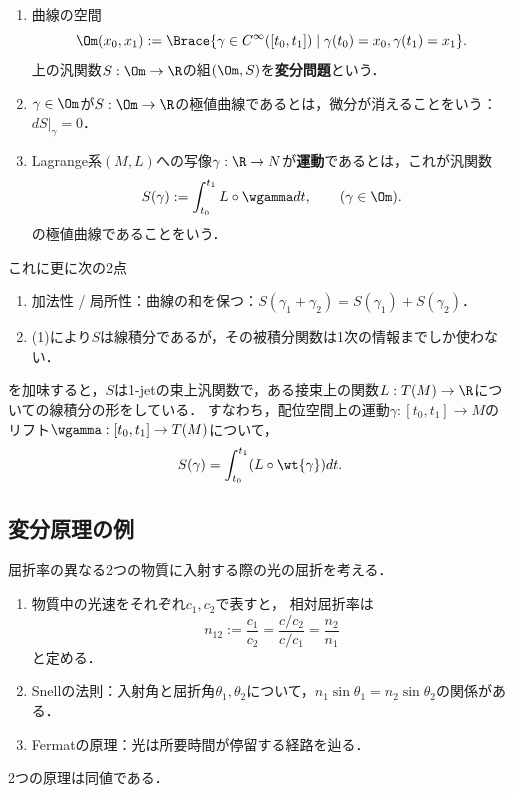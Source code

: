 \documentclass[uplatex,dvipdfmx]{jsreport}
\begin{document}
\begin{definition}\mbox{}
    \begin{enumerate}
        \item 曲線の空間
        \[\Om(x_0,x_1):=\Brace{\gamma\in C^\infty([t_0,t_1])\mid \gamma(t_0)=x_0,\gamma(t_1)=x_1}.\]
        上の汎関数$S:\Om\to\R$の組$(\Om,S)$を\textbf{変分問題}という．
        \item $\gamma\in\Om$が$S:\Om\to\R$の極値曲線であるとは，微分が消えることをいう：
        $dS|_\gamma=0$．
        \item Lagrange系$(M,L)$への写像$\gamma:\R\to N$が\textbf{運動}であるとは，これが汎関数
        \[S(\gamma):=\int^{t_1}_{t_0}L\circ\wgamma dt,\qquad(\gamma\in\Om).\]
        の極値曲線であることをいう．
    \end{enumerate}
\end{definition}
\begin{remarks}
    これに更に次の2点
    \begin{enumerate}
        \item 加法性 / 局所性：曲線の和を保つ：$S(\gamma_1+\gamma_2)=S(\gamma_1)+S(\gamma_2)$．
        \item (1)により$S$は線積分であるが，その被積分関数は1次の情報までしか使わない．
    \end{enumerate}
    を加味すると，$S$は1-jetの束上汎関数で，ある接束上の関数$L:T(M)\to\R$についての線積分の形をしている．
    すなわち，配位空間上の運動$\gamma:[t_0,t_1]\to M$のリフト$\wgamma:[t_0,t_1]\to T(M)$について，
    \[S(\gamma)=\int^{t_1}_{t_0}(L\circ\wt{\gamma})dt.\]
\end{remarks}

\subsection{変分原理の例}

\begin{example}[幾何光学]
    屈折率の異なる2つの物質に入射する際の光の屈折を考える．
    \begin{enumerate}
        \item 物質中の光速をそれぞれ$c_1,c_2$で表すと，
        相対屈折率は
        \[n_{12}:=\frac{c_1}{c_2}=\frac{c/c_2}{c/c_1}=\frac{n_2}{n_1}\]
        と定める．
        \item Snellの法則：入射角と屈折角$\theta_1,\theta_2$について，$n_1\sin\theta_1=n_2\sin\theta_2$の関係がある．
        \item Fermatの原理：光は所要時間が停留する経路を辿る．
    \end{enumerate}
    2つの原理は同値である．
\end{example}
\end{document}

